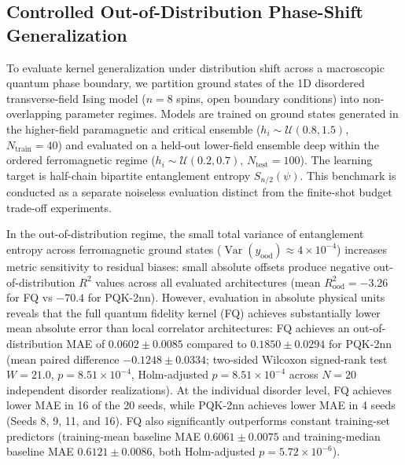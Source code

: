 
\subsection{Controlled Out-of-Distribution Phase-Shift Generalization}
To evaluate kernel generalization under distribution shift across a macroscopic quantum phase boundary, we partition ground states of the 1D disordered transverse-field Ising model ($n = 8$ spins, open boundary conditions) into non-overlapping parameter regimes. Models are trained on ground states generated in the higher-field paramagnetic and critical ensemble ($h_i \sim \mathcal{U}(0.8, 1.5)$, $N_{\text{train}} = 40$) and evaluated on a held-out lower-field ensemble deep within the ordered ferromagnetic regime ($h_i \sim \mathcal{U}(0.2, 0.7)$, $N_{\text{test}} = 100$). The learning target is half-chain bipartite entanglement entropy $S_{n/2}(\psi)$. This benchmark is conducted as a separate noiseless evaluation distinct from the finite-shot budget trade-off experiments.

In the out-of-distribution regime, the small total variance of entanglement entropy across ferromagnetic ground states ($\operatorname{Var}(y_{\text{ood}}) \approx 4 \times 10^{-4}$) increases metric sensitivity to residual biases: small absolute offsets produce negative out-of-distribution $R^2$ values across all evaluated architectures (mean $R^2_{\text{ood}} = -3.26$ for FQ vs $-70.4$ for PQK-2nn). However, evaluation in absolute physical units reveals that the full quantum fidelity kernel (FQ) achieves substantially lower mean absolute error than local correlator architectures: FQ achieves an out-of-distribution MAE of $0.0602 \pm 0.0085$ compared to $0.1850 \pm 0.0294$ for PQK-2nn (mean paired difference $-0.1248 \pm 0.0334$; two-sided Wilcoxon signed-rank test $W = 21.0$, $p = 8.51 \times 10^{-4}$, Holm-adjusted $p = 8.51 \times 10^{-4}$ across $N = 20$ independent disorder realizations). At the individual disorder level, FQ achieves lower MAE in 16 of the 20 seeds, while PQK-2nn achieves lower MAE in 4 seeds (Seeds 8, 9, 11, and 16). FQ also significantly outperforms constant training-set predictors (training-mean baseline MAE $0.6061 \pm 0.0075$ and training-median baseline MAE $0.6121 \pm 0.0086$, both Holm-adjusted $p = 5.72 \times 10^{-6}$).

